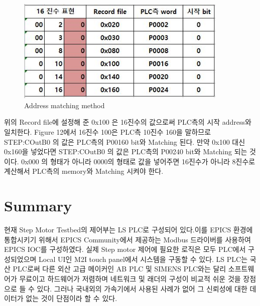 \documentclass[11pt
  , a4paper
  , article
  , oneside
]{memoir}
\begin{document}
\begin{figure}[h]
	\centering
	\includegraphics[width=0.9\textwidth]{./picture/MAtching.JPG}
	\caption{
		Address matching method
	}
	\label{fig:}
\end{figure}

위의 Record file에 설정해 준 0x100 은 16진수의 값으로써 PLC측의 시작 address와 일치한다. Figure 12에서 16진수 100은 PLC측 10진수 160을 말하므로 STEP:COutB0 의 값은 PLC측의 P00160 bit와 Matching 된다. 만약 0x100 대신 0x160을 넣었다면 STEP:COutB0 의 값은 PLC측의 P00240 bit와 Matching 되는 것이다. 0x000 의 형태가 아니라 0000의 형태로 값을 넣어주면 16진수가 아니라 8진수로 계산해서 PLC측의 memory와 Matching 시켜야 한다. 


\section{Summary}
현재 Step Motor Testbed의 제어부는 LS PLC로 구성되어 있다.이를 EPICS 환경에 통합시키기 위해서 EPICS Community에서 제공하는 Modbus 드라이버를 사용하여 EPICS IOC를 구성하였다. 실제 Step motor 제어에 필요한 로직은 모두 PLC에서 구성되었으며 Local UI인 M2I touch panel에서 시스템을 구동할 수 있다. LS PLC는 국산 PLC로써 다른 외산 고급 메이커인 AB PLC 및 SIMENS PLC와는 달리 소프트웨어가 무료이고 하드웨어가 저렴하며 네트워크 및 래더의 구성이 비교적 쉬운 것을 장점으로 들 수 있다. 그러나 국내외의 가속기에서 사용된 사례가 없어 그 신뢰성에 대한 데이터가 없는 것이 단점이라 할 수 있다.
  
\end{document}
